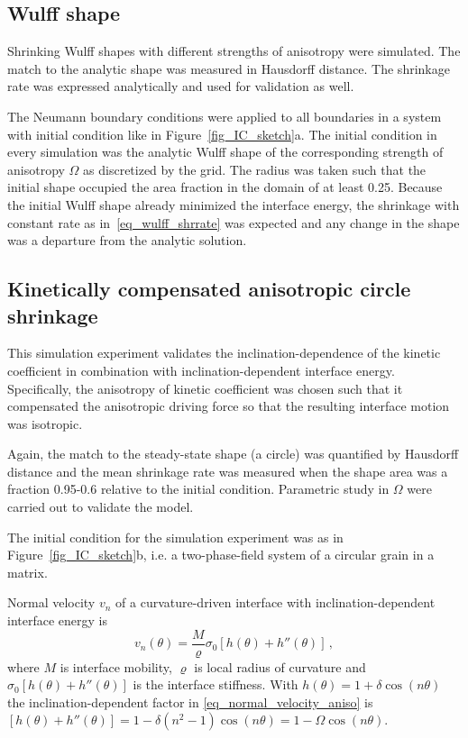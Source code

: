 \subsection{Wulff shape}

Shrinking Wulff shapes with different strengths of anisotropy were simulated. The match to the analytic shape was measured in Hausdorff distance. The shrinkage rate was expressed analytically and used for validation as well.

The Neumann boundary conditions were applied to all boundaries in a system with initial condition like in Figure~\ref{fig_IC_sketch}a. The initial condition in every simulation was the analytic Wulff shape of the corresponding strength of anisotropy $\Omega$ as discretized by the grid. The radius was taken such that the initial shape occupied the area fraction in the domain of at least 0.25. Because the initial Wulff shape already minimized the interface energy, the shrinkage with constant rate as in~\eqref{eq_wulff_shrrate} was expected and any change in the shape was a departure from the analytic solution. 

\subsection{Kinetically compensated anisotropic circle shrinkage}
This simulation experiment validates the inclination-dependence of the kinetic coefficient in combination with inclination-dependent interface energy. 
Specifically, the anisotropy of kinetic coefficient was chosen such that it compensated the anisotropic driving force so that the resulting interface motion was isotropic. 

Again, the match to the steady-state shape (a circle) was quantified by Hausdorff distance and the mean shrinkage rate was measured when the shape area was a fraction 0.95-0.6 relative to the initial condition. Parametric study in $\Omega$ were carried out to validate the model.

The initial condition for the simulation experiment was as in Figure~\ref{fig_IC_sketch}b, i.e. a two-phase-field system of a circular grain in a matrix.  

Normal velocity $v_n$ of a curvature-driven interface with inclination-dependent interface energy is~\cite{Abdeljawad2018}
\begin{equation}\label{eq_normal_velocity_aniso}
	v_n(\theta) = \frac{M}{\varrho}  \sigma_0[h(\theta)+h''(\theta)]\,,
\end{equation}
where $M$ is interface mobility, $\varrho$ is local radius of curvature and $\sigma_0[h(\theta)+h''(\theta)]$ is the interface stiffness. With $h(\theta)=1+\delta\cos(n\theta)$ the inclination-dependent factor in \eqref{eq_normal_velocity_aniso} is $[h(\theta)+h''(\theta)] = 1 - \delta(n^2-1)\cos(n\theta) = 1-\Omega\cos(n\theta)$.

